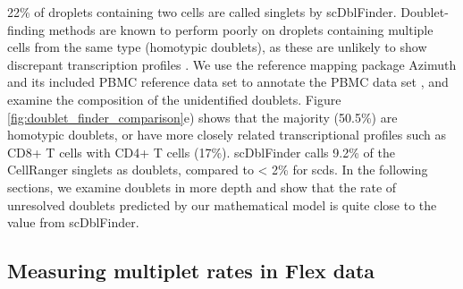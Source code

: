 \documentclass[unnumsec,webpdf,modern,large]{oup-authoring-template}
\begin{document}
	22\% of droplets containing two cells are called singlets by scDblFinder. 
	Doublet-finding methods are known to perform poorly on droplets containing multiple cells from the same type (homotypic doublets), as these are unlikely to show discrepant transcription profiles
	\citep{Xiong2022, Neavin2024}.
	We use the reference mapping package Azimuth and its included PBMC reference data set to annotate the PBMC data set
	\citep{Hao2021},
	and examine the composition of the unidentified doublets. 	
	Figure \ref{fig:doublet_finder_comparison}e) shows that the majority (50.5\%) are homotypic doublets, or have more closely related transcriptional profiles such as CD8+ T cells with CD4+ T cells (17\%).	
	scDblFinder calls 9.2\% of the CellRanger singlets as doublets, compared to < 2\% for scds. 
	In the following sections, we examine doublets in more depth and show that the rate of unresolved doublets predicted by our mathematical model is quite close to the value from scDblFinder.
	
	\subsection{Measuring multiplet rates in Flex data}
	
\end{document}
